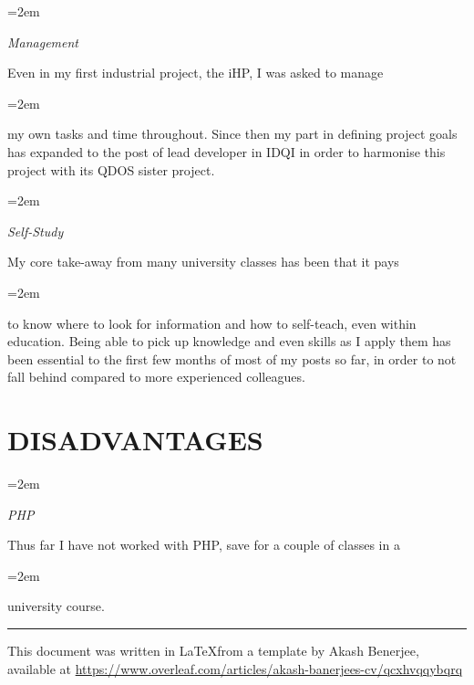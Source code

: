 \documentclass[paper=a4,fontsize=11pt]{scrartcl} %
\newlength{\spacebox}
\newcommand{\sepspace}{\vspace*{1em}}		%
\newcommand{\NewPart}[1]{\section*{\uppercase{#1}}}
\newcommand{\PersonalEntry}[2]{
		\noindent\hangindent=2em\hangafter=0 %
		\parbox{\spacebox}{        %
		\textit{#1}}		       %
		\hspace{1.5em} #2 \par}    %
\newcommand{\SkillsEntry}[2]{      %
		\noindent\hangindent=2em\hangafter=0 %
		\parbox{\spacebox}{        %
		\textit{#1}}			   %
		\hspace{1.5em} \parbox{6\spacebox}{#2} \par}    %
\begin{document}
\SkillsEntry{Management}{Even in my first industrial project, the iHP, I was asked to manage }
\vspace{3pt}
\SkillsEntry{}{my own tasks and time throughout. Since then my part in defining project goals has expanded to the post of lead developer in IDQI in order to harmonise this project with its QDOS sister project.}
\sepspace

\SkillsEntry{Self-Study}{My core take-away from many university classes has been that it pays } 
\vspace{3pt}
\SkillsEntry{}{to know where to look for information and how to self-teach, even within education. Being able to pick up knowledge and even skills as I apply them has been essential to the first few months of most of my posts so far, in order to not fall behind compared to more experienced colleagues.}
\sepspace


\NewPart{Disadvantages}

\SkillsEntry{PHP}{Thus far I have not worked with PHP, save for a couple of classes in a}
\vspace{3pt}
\SkillsEntry{}{university course.}
\sepspace


\vfill
\small
\centering
\rule{\linewidth}{0.4pt}
This document was written in \LaTeX\space from a template by Akash Benerjee, available at \url{https://www.overleaf.com/articles/akash-banerjees-cv/qcxhvqqybqrq}
\end{document}

